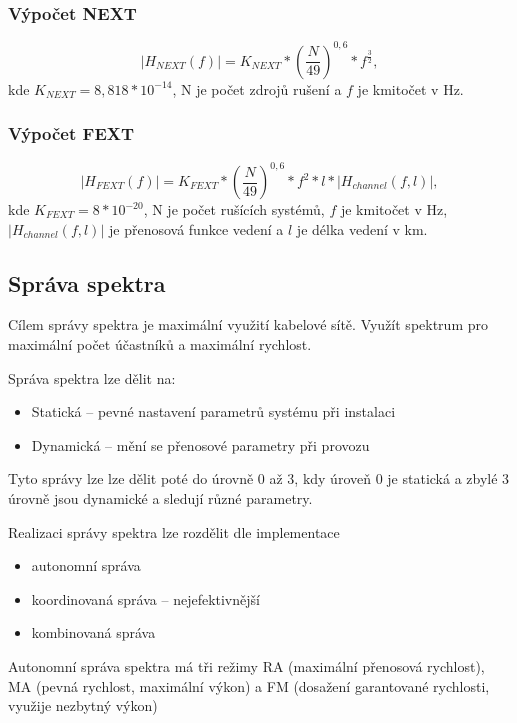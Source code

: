 \subsubsection{Výpočet NEXT}

\[|H_{NEXT}(f)| = K_{NEXT} * (\frac{N}{49})^{0,6} * f^{\frac{3}{2}},\]
kde $K_{NEXT} = 8,818 * 10^{-14}$, N je počet zdrojů rušení a $f$ je kmitočet v Hz. 

\subsubsection{Výpočet FEXT}

\[|H_{FEXT}(f)| = K_{FEXT} * (\frac{N}{49})^{0,6} * f^2 * l * |H_{channel}(f, l)|,\]
kde $K_{FEXT} = 8 * 10^{-20}$, N je počet rušících systémů, $f$ je kmitočet v Hz, $|H_{channel}(f, l)|$ je přenosová funkce vedení a $l$ je délka vedení v km.

\subsection{Správa spektra}

Cílem správy spektra je maximální využití kabelové sítě.
Využít spektrum pro maximální počet účastníků a maximální rychlost.

Správa spektra lze dělit na:

\begin{itemize}
    \item Statická -- pevné nastavení parametrů systému při instalaci
    \item Dynamická -- mění se přenosové parametry při provozu
\end{itemize}

Tyto správy lze lze dělit poté do úrovně 0 až 3, kdy úroveň 0 je statická a zbylé 3 úrovně jsou dynamické a sledují různé parametry.

Realizaci správy spektra lze rozdělit dle implementace

\begin{itemize}
    \item autonomní správa
    \item koordinovaná správa -- nejefektivnější
    \item kombinovaná správa
\end{itemize}

Autonomní správa spektra má tři režimy RA (maximální přenosová rychlost), MA (pevná rychlost, maximální výkon) a FM (dosažení garantované rychlosti, využije nezbytný výkon)

